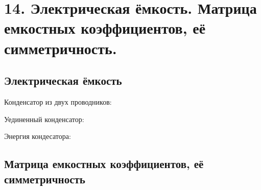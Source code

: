 \section*{14. Электрическая ёмкость. Матрица емкостных коэффициентов, её симметричность.}

\subsection*{Электрическая ёмкость}

Конденсатор из двух проводников:



Уединенный конденсатор:



Энергия кондесатора:


\newpage

\subsection*{Матрица емкостных коэффициентов, её симметричность}



